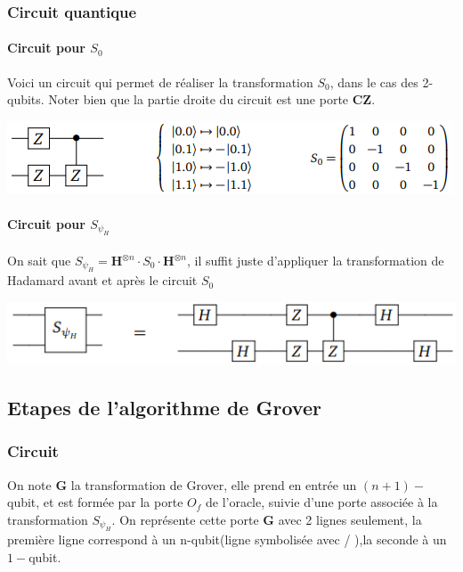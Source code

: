 \documentclass[12pt,openany]{report}
\begin{document}
\subsubsection{Circuit quantique}

\paragraph{Circuit pour $ \mathit{S}_0$} Voici un circuit qui permet de réaliser la transformation $\mathit{S}_0$, dans le cas des 2-qubits. Noter bien que la partie droite du circuit est une porte \textbf{CZ}.
\begin{center}
\includegraphics[scale=1.3]{./circuit_so}
\end{center}
\paragraph{Circuit pour $\mathit{S}_{\psi_H} $} On sait que $\mathit{S}_{\psi_H}=\mathbf{H}^{\otimes n}\cdot \mathit{S}_0 \cdot \mathbf{H}^{\otimes n} $, il suffit juste d'appliquer la transformation de Hadamard avant et après le circuit $ \mathit{S}_0$

\begin{center}
\includegraphics[scale=1.3]{./circuit_sw}
\end{center}
\subsection{Etapes de l'algorithme de Grover}

\subsubsection{Circuit}
On note \textbf{G} la transformation de Grover, elle prend en entrée un $(n+1)-$qubit, et est formée par la porte $\mathit{O}_f $ de l'oracle, suivie d'une porte associée à la transformation $\mathit{S}_{\psi_H}$. On représente cette porte \textbf{G} avec 2 lignes seulement, la première ligne correspond à un n-qubit(ligne symbolisée avec / ),la seconde à un $1-$qubit.
\end{document}
